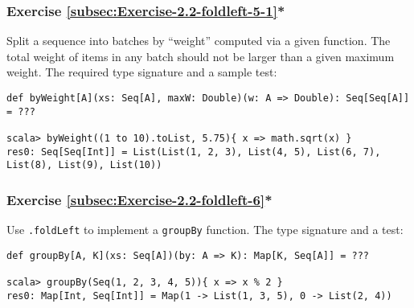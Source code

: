 \subsubsection{Exercise \label{subsec:Exercise-2.2-foldleft-5-1}\ref{subsec:Exercise-2.2-foldleft-5-1}{*}}

Split a sequence into batches by ``weight'' computed via a given
function. The total weight of items in any batch should not be larger
than a given maximum weight. The required type signature and a sample
test:
\begin{lstlisting}
def byWeight[A](xs: Seq[A], maxW: Double)(w: A => Double): Seq[Seq[A]] = ???

scala> byWeight((1 to 10).toList, 5.75){ x => math.sqrt(x) }
res0: Seq[Seq[Int]] = List(List(1, 2, 3), List(4, 5), List(6, 7), List(8), List(9), List(10))
\end{lstlisting}
\begin{comment}
Solution:
\begin{lstlisting}
def weightBatching[A](xs: Seq[A], maxW: Double)(w: A => Double): Seq[Seq[A]] = {  
  type Acc = (Seq[Seq[A]], Seq[A], Double)
  val init: Acc = ((Seq(), Seq(), 0.0))
  val (result, rem, _) = xs.foldLeft(init) { case ((seq, rem, weight), x) =>
    val wx = w(x)
    if (wx > maxW) (seq ++ Seq(rem, Seq(x)), Seq(), 0.0)
    else {
      val newWeight = weight + wx
      if (newWeight > maxW) (seq ++ Seq(rem), Seq(x), wx)
      else (seq, rem ++ Seq(x), newWeight)
    }
  }
  result ++ Seq(rem)
}
\end{lstlisting}
\end{comment}


\subsubsection{Exercise \label{subsec:Exercise-2.2-foldleft-6}\ref{subsec:Exercise-2.2-foldleft-6}{*}}

Use \lstinline!.foldLeft! to implement a \lstinline!groupBy! function.
The type signature and a test:
\begin{lstlisting}
def groupBy[A, K](xs: Seq[A])(by: A => K): Map[K, Seq[A]] = ???

scala> groupBy(Seq(1, 2, 3, 4, 5)){ x => x % 2 }
res0: Map[Int, Seq[Int]] = Map(1 -> List(1, 3, 5), 0 -> List(2, 4))
\end{lstlisting}

